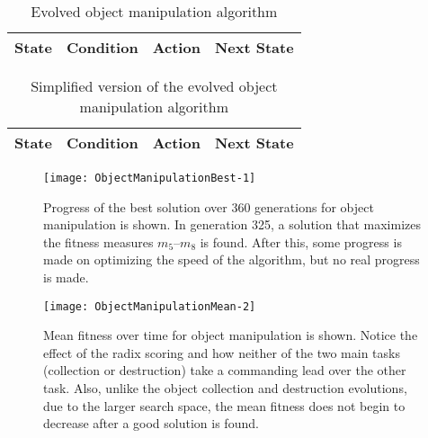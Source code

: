 \begin{table}[ht]
  \centering
  \caption{Evolved object manipulation algorithm}
  \small
  \begin{tabular}{|c|c|l|c|}
    \hline
    State & Condition & Action & Next State \\
    \hline
    
  \end{tabular}
  \label{tab:ManipulationAlgorithm}
\end{table}

\begin{table}[ht]
  \centering
  \caption{Simplified version of the evolved object manipulation algorithm}
  \small
  \begin{tabular}{|c|c|l|c|}
    \hline
    State & Condition & Action & Next State \\
    \hline
    
  \end{tabular}
  \label{tab:ManipulationAlgorithmReduced}
\end{table}

\begin{figure}[f]
  \centering
  \texttt{[image: ObjectManipulationBest-1]}
  \caption[Progress of the best solution for object manipulation.]{Progress of the best solution over 360 generations for object manipulation is shown.  In generation 325, a solution that maximizes the fitness measures $m_5$--$m_8$ is found.  After this, some progress is made on optimizing the speed of the algorithm, but no real progress is made.}
  \label{fig:ManipulationBest}
  \texttt{[image: ObjectManipulationMean-2]}
  \caption[Mean fitness over time for object manipulation.]{Mean fitness over time for object manipulation is shown.  Notice the effect of the radix scoring and how neither of the two main tasks (collection or destruction) take a commanding lead over the other task.  Also, unlike the object collection and destruction evolutions, due to the larger search space, the mean fitness does not begin to decrease after a good solution is found.}
  \label{fig:ManipulationMean}
\end{figure}

